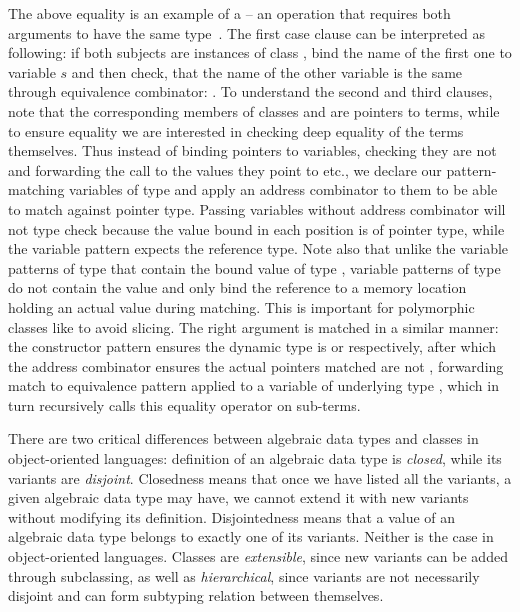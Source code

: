 \noindent
The above equality is an example of a  -- an operation that 
requires both arguments to have the same type~\cite{BCCLP95}. The first case 
clause can be interpreted as following: if both subjects are instances of class 
, bind the name of the first one to variable $s$ and then check, that 
the name of the other variable is the same through equivalence combinator: 
. To understand the second and third clauses, note that the 
corresponding members of classes  and  are pointers to 
terms, while to ensure equality we are interested in checking deep equality of 
the terms themselves. Thus instead of binding pointers to variables, checking 
they are not  and forwarding the call to the values they point to 
etc., we declare our pattern-matching variables of type  
and apply an address combinator to them to be able to match against pointer 
type. Passing variables without address combinator will not type check because 
the value bound in each position is of pointer type, while the variable pattern 
expects the reference type. Note also that unlike the variable patterns of type 
 that contain the bound value of type , variable patterns 
of type  do not contain the value and only bind the reference to a 
memory location holding an actual value during matching. This is important for 
polymorphic classes like  to avoid slicing. The right argument is 
matched in a similar manner: the constructor pattern ensures the dynamic type is 
 or  respectively, after which the address combinator 
ensures the actual pointers matched are not , forwarding match to 
equivalence pattern applied to a variable of underlying type , 
which in turn recursively calls this equality operator on sub-terms.

There are two critical differences between algebraic data types and classes in 
object-oriented languages: definition of an algebraic data type is \emph{closed}, 
while its variants are \emph{disjoint}. Closedness means that once we have listed 
all the variants, a given algebraic data type may have, we cannot extend it with 
new variants without modifying its definition. Disjointedness means that a value 
of an algebraic data type belongs to exactly one of its variants. Neither is the 
case in object-oriented languages. Classes are \emph{extensible}, since new 
variants can be added through subclassing, as well as \emph{hierarchical}, since 
variants are not necessarily disjoint and can form subtyping relation between 
themselves.

